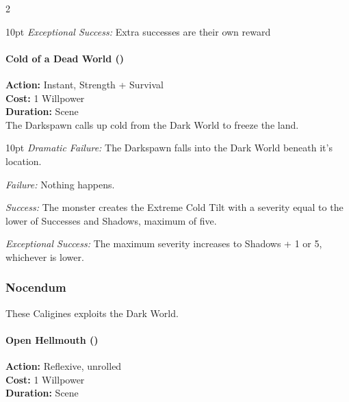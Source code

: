 \begin{multicols}{2}
\begin{myindentpar}{10pt}
    \emph{Exceptional Success:} Extra successes are their own reward\end{myindentpar}


\paragraph*{Cold of a Dead World (\textbullet\textbullet\textbullet)}

\noindent \textbf{Action:} Instant, Strength + Survival\\

\noindent \textbf{Cost:} 1 Willpower\\

\noindent \textbf{Duration:} Scene \\

The Darkspawn calls up cold from the Dark World to freeze the land. 

\begin{myindentpar}{10pt} \emph{Dramatic Failure:} The Darkspawn falls into the Dark World beneath it's location. 

    \emph{Failure:} Nothing happens. 

    \emph{Success:} The monster creates the Extreme Cold Tilt with a severity equal to the lower of Successes and Shadows, maximum of five. 

    \emph{Exceptional Success:} The maximum severity increases to Shadows + 1 or 5, whichever is lower.

    \end{myindentpar}

\subsubsection*{Nocendum}

These Caligines exploits the Dark World.  \\

\paragraph*{Open Hellmouth (\textbullet)} 

\noindent \textbf{Action:} Reflexive, unrolled \\

\noindent \textbf{Cost:} 1 Willpower \\

\noindent \textbf{Duration:} Scene \\


\end{multicols}
